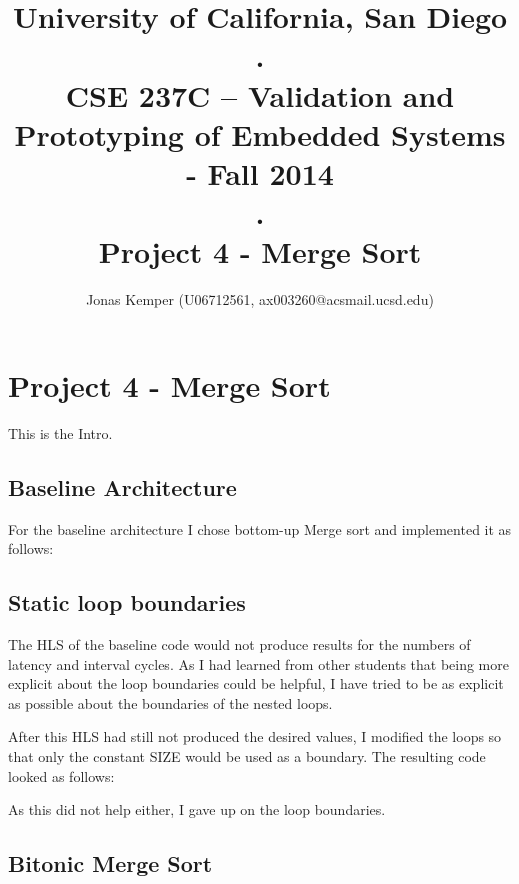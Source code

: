 \documentclass[11pt]{report}
\begin{document}
\title{University of California, San Diego \protect\\ . \protect\\ CSE 237C – Validation and Prototyping of Embedded Systems - Fall 2014 \protect\\ .\protect\\ Project 4 - Merge Sort}

\author{Jonas Kemper (U06712561, ax003260@acsmail.ucsd.edu)}

\maketitle

\chapter{Project 4 - Merge Sort}
\label{chap:1}

This is the Intro.

\section{Baseline Architecture}

For the baseline architecture I chose bottom-up Merge sort and implemented it as follows:



\section{Static loop boundaries}

The HLS of the baseline code would not produce results for the numbers of latency and interval cycles. As I had learned from other students that being more explicit about the loop boundaries could be helpful, I have tried to be as explicit as possible about the boundaries of the nested loops.

After this HLS had still not produced the desired values, I modified the loops so that only the constant SIZE would be used as a boundary. The resulting code looked as follows:



As this did not help either, I gave up on the loop boundaries.

\section{Bitonic Merge Sort}
\end{document}

